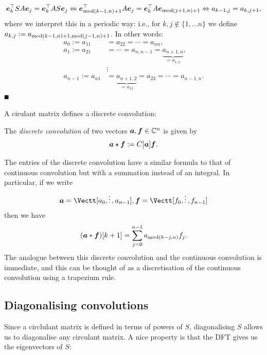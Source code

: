 \[
\bm{{\mbox{\boldmath$e$\unboldmath}}}_k^\top S A \bm{{\mbox{\boldmath$e$\unboldmath}}}_j =  \bm{{\mbox{\boldmath$e$\unboldmath}}}_k^\top A S \bm{{\mbox{\boldmath$e$\unboldmath}}}_j \Leftrightarrow 
 \bm{{\mbox{\boldmath$e$\unboldmath}}}_{{\rm mod}(k-1,n)+1}^\top A \bm{{\mbox{\boldmath$e$\unboldmath}}}_j =  \bm{{\mbox{\boldmath$e$\unboldmath}}}_k^\top A \bm{{\mbox{\boldmath$e$\unboldmath}}}_{{\rm mod}(j+1,n)+1} \Leftrightarrow
 a_{k-1,j} = a_{k,j+1},
\]
where we interpret this in a periodic way: i.e., for $k,j \ensuremath{\notin} \{1,\ensuremath{\ldots}n\}$ we define  $a_{k,j} := a_{{\rm mod}(k-1,n)+1, {\rm mod}(j-1,n)+1}$. In other words:
\begin{align*}
a_0 := a_{11} &= a_{22} = \ensuremath{\cdots} = a_{nn}, \\
a_1 := a_{21} &= \ensuremath{\cdots} = a_{n,n-1} = \underbrace{a_{n+1,n}}_{=a_{1,n}}, \\
&\ensuremath{\vdots} \\
a_{n-1} := a_{n1} &= \underbrace{a_{n+1,2}}_{=a_{12}}  = a_{23} = \ensuremath{\cdots} = a_{n-1,n}.
\end{align*}
\ensuremath{\QED}

A cirulant matrix defines a discrete convolution:

\begin{definition} The \emph{discrete convolution} of two vectors $\bm{{\mbox{\boldmath$a$\unboldmath}}}, \bm{{\mbox{\boldmath$f$\unboldmath}}} \in {\mathbb C}^n$  is given by
\[
\bm{{\mbox{\boldmath$a$\unboldmath}}} \star \bm{{\mbox{\boldmath$f$\unboldmath}}} := C[\bm{{\mbox{\boldmath$a$\unboldmath}}}] \bm{{\mbox{\boldmath$f$\unboldmath}}}.
\]
\end{definition}

The entries of the discrete convolution have a similar formula to that of continuous convolution but with a summation instead of an integral. In particular, if we write
\[
\ensuremath{\bm{\a}} = \Vectt[a_0,\ensuremath{\vdots},a_{n-1}], 
\ensuremath{\bm{\f}} = \Vectt[f_0,\ensuremath{\vdots},f_{n-1}]
\]
then we have
\[
(\bm{{\mbox{\boldmath$a$\unboldmath}}} * \bm{{\mbox{\boldmath$f$\unboldmath}}})[k+1] = \sum_{j=0}^{n-1} a_{{\rm mod}(k-j,n)} f_j.
\]
The analogue between this discrete convolution and the continuous convolution is immediate, and this can be thought of as a discretisation of the continuous convolution using a trapezium rule.

\subsection{Diagonalising convolutions}
Since a circlulant matrix is defined in terms of powers of $S$,  diagonalising $S$ allows us to diagonalise any circulant matrix. A nice property is that the DFT gives us the eigenvectors of $S$:

